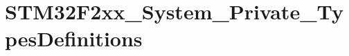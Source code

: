 \hypertarget{group___s_t_m32_f2xx___system___private___types_definitions}{\section{S\-T\-M32\-F2xx\-\_\-\-System\-\_\-\-Private\-\_\-\-Types\-Definitions}
\label{group___s_t_m32_f2xx___system___private___types_definitions}
}
